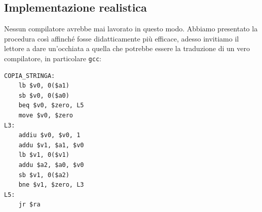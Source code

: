 \documentclass[class=book, crop=false, oneside]{standalone}
\begin{document}
\subsection{Implementazione realistica}
Nessun compilatore avrebbe mai lavorato in questo modo. Abbiamo presentato la procedura così affinché fosse didatticamente più efficace, adesso invitiamo il lettore a dare un'occhiata a quella che potrebbe essere la traduzione di un vero compilatore, in particolare \texttt{gcc}:
\begin{verbatim}
COPIA_STRINGA:
	lb $v0, 0($a1)
	sb $v0, 0($a0)
	beq $v0, $zero, L5
	move $v0, $zero
L3:
	addiu $v0, $v0, 1
	addu $v1, $a1, $v0
	lb $v1, 0($v1)
	addu $a2, $a0, $v0
	sb $v1, 0($a2)
	bne $v1, $zero, L3
L5:
	jr $ra
\end{verbatim}
\end{document}
